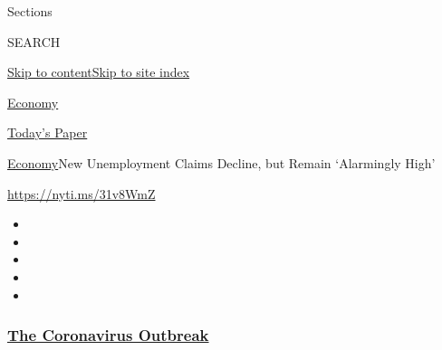 Sections

SEARCH

\protect\hyperlink{site-content}{Skip to
content}\protect\hyperlink{site-index}{Skip to site index}

\href{https://www.nytimes3xbfgragh.onion/section/business/economy}{Economy}

\href{https://myaccount.nytimes3xbfgragh.onion/auth/login?response_type=cookie\&client_id=vi}{}

\href{https://www.nytimes3xbfgragh.onion/section/todayspaper}{Today's
Paper}

\href{/section/business/economy}{Economy}\textbar{}New Unemployment
Claims Decline, but Remain `Alarmingly High'

\url{https://nyti.ms/31v8WmZ}

\begin{itemize}
\item
\item
\item
\item
\item
\end{itemize}

\hypertarget{the-coronavirus-outbreak}{%
\subsubsection{\texorpdfstring{\href{https://www.nytimes3xbfgragh.onion/news-event/coronavirus?name=styln-coronavirus-markets\&region=TOP_BANNER\&block=storyline_menu_recirc\&action=click\&pgtype=Article\&impression_id=20f70df0-f1e8-11ea-8873-159c3de9cd3c\&variant=undefined}{The
Coronavirus
Outbreak}}{The Coronavirus Outbreak}}\label{the-coronavirus-outbreak}}

